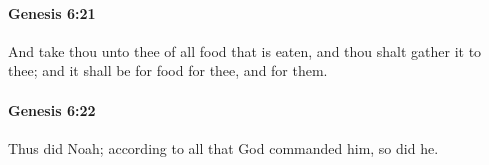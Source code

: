 		\paragraph{Genesis 6:21} %
			\label{GENESIS-6-21}

			And take thou unto thee of all food that is eaten, and thou shalt gather it to thee; and it shall be for food for thee, and for them.


		\paragraph{Genesis 6:22} %
			\label{GENESIS-6-22}

			Thus did Noah; according to all that God commanded him, so did he.

